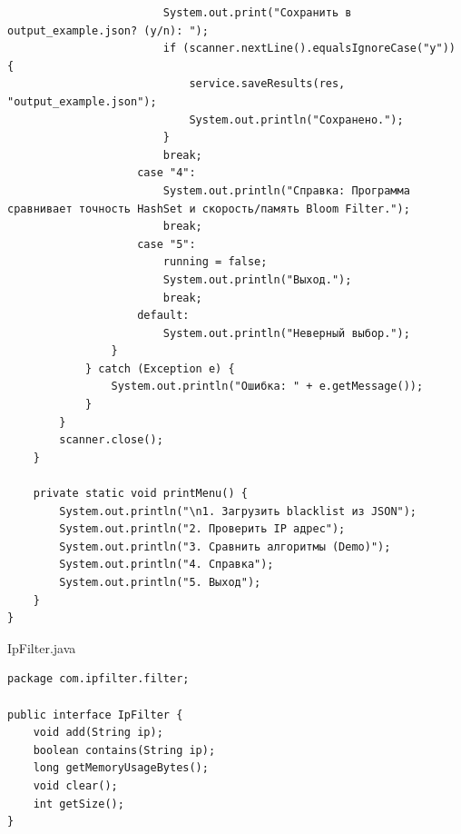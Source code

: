 \begin{verbatim}
                        System.out.print("Сохранить в output_example.json? (y/n): ");
                        if (scanner.nextLine().equalsIgnoreCase("y")) {
                            service.saveResults(res, "output_example.json");
                            System.out.println("Сохранено.");
                        }
                        break;
                    case "4":
                        System.out.println("Справка: Программа сравнивает точность HashSet и скорость/память Bloom Filter.");
                        break;
                    case "5":
                        running = false;
                        System.out.println("Выход.");
                        break;
                    default:
                        System.out.println("Неверный выбор.");
                }
            } catch (Exception e) {
                System.out.println("Ошибка: " + e.getMessage());
            }
        }
        scanner.close();
    }

    private static void printMenu() {
        System.out.println("\n1. Загрузить blacklist из JSON");
        System.out.println("2. Проверить IP адрес");
        System.out.println("3. Сравнить алгоритмы (Demo)");
        System.out.println("4. Справка");
        System.out.println("5. Выход");
    }
}

\end{verbatim}

IpFilter.java
\begin{verbatim}
package com.ipfilter.filter;

public interface IpFilter {
    void add(String ip);
    boolean contains(String ip);
    long getMemoryUsageBytes();
    void clear();
    int getSize();
}

\end{verbatim}


